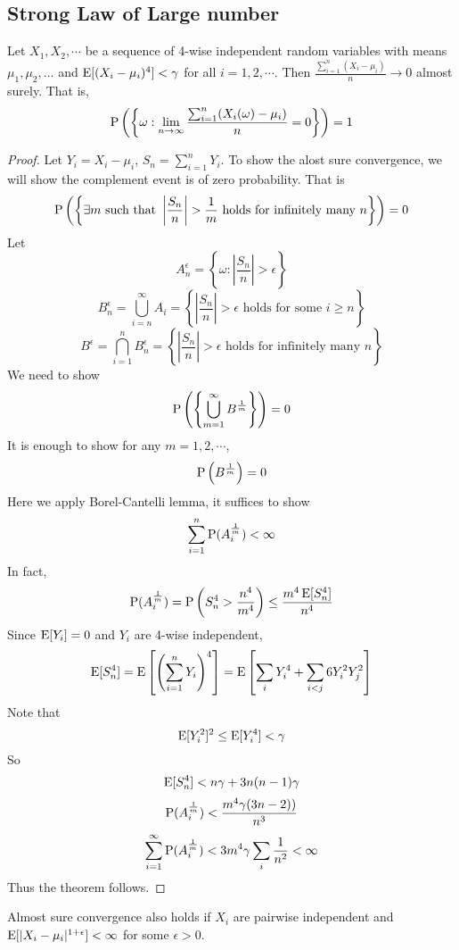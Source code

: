 \subsection{Strong Law of Large number}
\begin{theorem}
	Let $X_1, X_2,\cdots$ be a sequence of 4-wise independent random variables with means $\mu_1, \mu_2, \ldots$ and $\E[(X_i-\mu_i)^4] < \gamma$ for all $i=1,2,\cdots$. Then $\frac{\sum_{i=1}^n (X_i-\mu_i)}{n} \to 0$ almost surely. That is,
	$$\P\left( \left\{ \omega: \lim_{n\to \infty} \frac{\sum_{i=1}^n (X_i(\omega)-\mu_i)}{n} =0 \right\} \right) = 1$$
\end{theorem}
\begin{proof}
	Let $Y_i = X_i-\mu_i$, $S_n = \sum_{i=1}^n Y_i$. To show the alost sure convergence, we will show the complement event is of zero probability. That is
	$$\P\left( \left\{ \exists m \textrm{ such that } \left|\frac{S_n}{n} \right| > \frac{1}{m} \textrm{ holds for infinitely many $n$}  \right\} \right) = 0$$
	Let
	$$A_n^\epsilon = \left\{\omega: \left| \frac{S_n}{n} \right| > \epsilon \right\}$$
	$$B_n^\epsilon = \bigcup_{i=n}^\infty A_i =\left\{\left|\frac{S_n}{n} \right| > \epsilon \textrm{ holds for some $i\geq n$}\right\}$$
	$$B^\epsilon = \bigcap_{i=1}^n B_n^\epsilon = \left\{\left|\frac{S_n}{n} \right| > \epsilon \textrm{ holds for infinitely many $n$}\right\}$$
	We need to show
	$$\P\left( \left\{ \bigcup_{m=1}^\infty B^{\frac{1}{m}}  \right\} \right) = 0$$
	It is enough to show for any $m=1,2,\cdots$,
	$$\P\left(  B^{\frac{1}{m}} \right) = 0$$
	Here we apply Borel-Cantelli lemma, it suffices to show
	$$\sum_{i=1}^n \P(A_i^\frac{1}{m}) < \infty$$
	In fact,
	$$\P(A_i^\frac{1}{m}) = \P \left(S_n^4 > \frac{n^4}{m^4} \right) \leq \frac{m^4\E[S_n^4]}{n^4}$$
	Since $\E[Y_i]=0$ and $Y_i$ are 4-wise independent,
	$$\E[S_n^4] = \E \left[\left(\sum_{i=1}^n Y_i\right)^4\right] = \E\left[ \sum_i Y_i^4 + \sum_{i<j} 6Y_i^2Y_j^2\right]$$
	Note that
	$$\E[Y_i^2]^2 \leq \E[Y_i^4] < \gamma$$
	So
	$$\E[S_n^4] < n\gamma + 3n(n-1)\gamma$$
	$$\P(A_i^\frac{1}{m}) < \frac{m^4 \gamma(3n-2))}{n^3}$$
	$$\sum_{i=1}^\infty \P(A_i^\frac{1}{m})< 3m^4\gamma \sum_i \frac{1}{n^2} < \infty$$
	Thus the theorem follows.
\end{proof}

\begin{remark}
	Almost sure convergence also holds if $X_i$ are pairwise independent and $\E[|X_i-\mu_i|^{1+\epsilon}]<\infty$ for some $\epsilon > 0$.
\end{remark}

